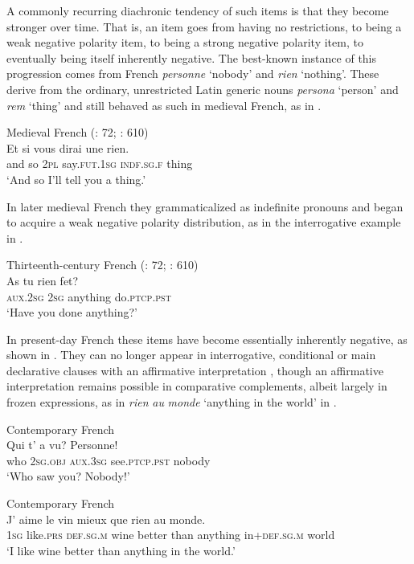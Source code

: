 \documentclass[output=paper]{langsci/langscibook}
\begin{document}
A commonly recurring diachronic tendency of such items is that they become stronger over time. That is, an item goes from having no restrictions, to being a weak negative polarity item, to being a strong negative polarity item, to eventually being itself inherently negative. The best-known instance of this progression comes from French \textit{personne} ‘nobody’ and \textit{rien} ‘nothing’. These derive from the ordinary, unrestricted Latin generic nouns \textit{persona} ‘person’ and \textit{rem} ‘thing’ and still behaved as such in medieval French, as in .


\ea\label{med}
{       Medieval French (\citealt{Hansen2013}: 72; \citealt{Buridant2000}: 610)} \\
\gll Et si vous dirai une rien.\\
     and so \textsc{2pl} say.\textsc{fut.1sg} \textsc{indf.sg.f} thing\\
\glt ‘And so I’ll tell you a thing.’
\z

In later medieval French they grammaticalized as indefinite pronouns and began to acquire a weak negative polarity distribution, as in the interrogative example in .

\ea\label{c13}
{Thirteenth-century French (\citealt{Hansen2013}: 72; \citealt{Buridant2000}: 610)} \\
\gll As tu rien fet?\\
     \textsc{aux.2sg} \textsc{2sg} anything do.\textsc{ptcp.pst}\\
\glt ‘Have you done anything?’
\z

In present-day French these items have become essentially inherently negative, as shown in . They can no longer appear in interrogative, conditional or main declarative clauses with an affirmative interpretation \citep[73]{Hansen2013}, though an affirmative interpretation remains possible in comparative complements, albeit largely in frozen expressions, as in \textit{rien} \textit{au} \textit{monde} ‘anything in the world’ in .

\ea\label{cont}
{       Contemporary French \citep[68]{Hansen2013}} \\
\gll Qui t’ a vu? Personne!\\
     who 2\textsc{sg.obj} \textsc{aux.3sg} see.\textsc{ptcp.pst} nobody\\
\glt ‘Who saw you? Nobody!’
\z

\ea\label{cont1}
{       Contemporary French \citep[73]{Hansen2013}} \\
\gll J’ aime le vin mieux que rien au monde.\\
     \textsc{1sg} like.\textsc{prs} \textsc{def.sg.m} wine better than anything in+\textsc{def.sg.m} world\\
\glt ‘I like wine better than anything in the world.’
\z
\end{document}

